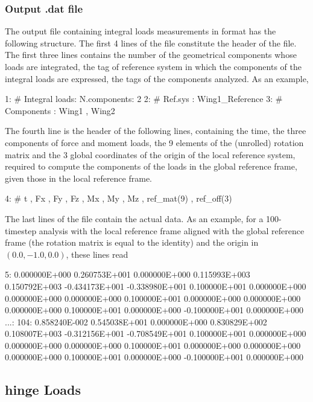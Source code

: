 \subsubsection{Output .dat file}
The output file containing integral loads measurements in  format has the following structure.
The first 4 lines of the file constitute the header of the file. The first three lines contains the number of the geometrical components  whose loads are integrated, the tag of reference system in which the components of the integral loads are expressed, the tags of the  components analyzed. As an example,
\begin{inputfile}
  1:  # Integral loads: N.components: 2
  2:  #                 Ref.sys     : Wing1_Reference
  3:  #                 Components  : Wing1 , Wing2
\end{inputfile}
The fourth line is the header of the following lines, containing the time, the three components of force and moment loads, the 9 elements of the (unrolled) rotation matrix and the 3 global coordinates of the origin of the local reference system, required to compute the components of the loads in the global reference frame, given those in the local reference frame.
\begin{inputfile}
  4:  #  t , Fx , Fy , Fz , Mx , My , Mz , ref_mat(9) , ref_off(3) 
\end{inputfile}
The last lines of the file contain the actual data. As an example, for a 100-timestep analysis with the local reference frame  aligned with the global reference frame (the rotation matrix is equal to the identity) and the origin in $(0.0,-1.0,0.0)$, these lines read
\begin{inputfile}
  5: 0.000000E+000  0.260753E+001  0.000000E+000  0.115993E+003
     0.150792E+003 -0.434173E+001 -0.338980E+001  0.100000E+001
     0.000000E+000  0.000000E+000  0.000000E+000  0.100000E+001
     0.000000E+000  0.000000E+000  0.000000E+000  0.100000E+001
     0.000000E+000 -0.100000E+001  0.000000E+000
...:
104: 0.858240E-002  0.545038E+001  0.000000E+000  0.830829E+002
     0.108007E+003 -0.312156E+001 -0.708549E+001  0.100000E+001
     0.000000E+000  0.000000E+000  0.000000E+000  0.100000E+001
     0.000000E+000  0.000000E+000  0.000000E+000  0.100000E+001
     0.000000E+000 -0.100000E+001  0.000000E+000
\end{inputfile}

\subsection{hinge Loads}

